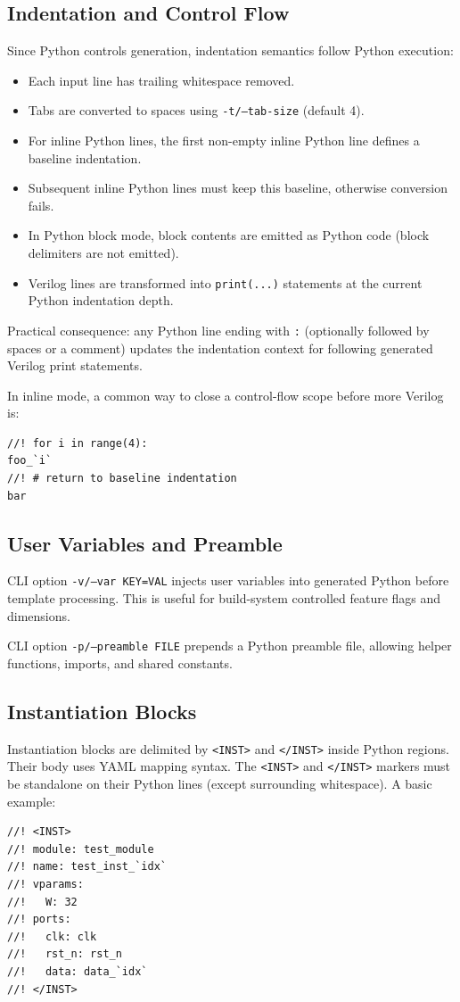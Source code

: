\subsection{Indentation and Control Flow}
Since Python controls generation, indentation semantics follow Python execution:
\begin{itemize}
  \item Each input line has trailing whitespace removed.
  \item Tabs are converted to spaces using \texttt{-t/--tab-size} (default 4).
  \item For inline Python lines, the first non-empty inline Python line defines a baseline indentation.
  \item Subsequent inline Python lines must keep this baseline, otherwise conversion fails.
  \item In Python block mode, block contents are emitted as Python code (block delimiters are not emitted).
  \item Verilog lines are transformed into \texttt{print(...)} statements at the current Python indentation depth.
\end{itemize}

Practical consequence:
any Python line ending with \texttt{:} (optionally followed by spaces or a comment)
updates the indentation context for following generated Verilog print statements.

In inline mode, a common way to close a control-flow scope before more Verilog is:
\begin{verbatim}
//! for i in range(4):
foo_`i`
//! # return to baseline indentation
bar
\end{verbatim}

\subsection{User Variables and Preamble}
CLI option \texttt{-v/--var KEY=VAL} injects user variables into generated Python before template processing.
This is useful for build-system controlled feature flags and dimensions.

CLI option \texttt{-p/--preamble FILE} prepends a Python preamble file,
allowing helper functions, imports, and shared constants.

\subsection{Instantiation Blocks}
Instantiation blocks are delimited by \texttt{<INST>} and \texttt{</INST>} inside Python regions.
Their body uses YAML mapping syntax.
The \texttt{<INST>} and \texttt{</INST>} markers must be standalone on their Python lines
(except surrounding whitespace).
A basic example:
\begin{verbatim}
//! <INST>
//! module: test_module
//! name: test_inst_`idx`
//! vparams:
//!   W: 32
//! ports:
//!   clk: clk
//!   rst_n: rst_n
//!   data: data_`idx`
//! </INST>
\end{verbatim}

